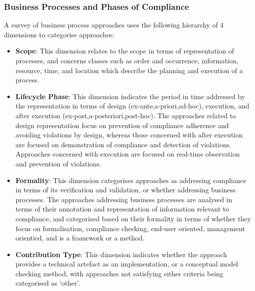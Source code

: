 \subsubsection{Business Processes and Phases of Compliance}
A survey of business process approaches \cite{fellmann_state---art_2014} uses the following hierarchy of 4 dimensions to categorise approaches:
\begin{itemize}
    \item \textbf{Scope}: This dimension relates to the scope in terms of representation of processes, and concerns classes such as order and occurrence, information, resource, time, and location which describe the planning and execution of a process.
    \item \textbf{Lifecycle Phase}: This dimension indicates the period in time addressed by the representation in terms of design (ex-ante,a-priori,ad-hoc), execution, and after execution (ex-post,a-posteriori,post-hoc). The approaches related to design representation focus on prevention of compliance adherence and avoiding violations by design, whereas those concerned with after execution are focused on demonstration of compliance and detection of violations. Approaches concerned with execution are focused on real-time observation and prevention of violations.
    \item \textbf{Formality}: This dimension categorises approaches as addressing compliance in terms of its verification and validation, or whether addressing business processes. The approaches addressing business processes are analysed in terms of their annotation and representation of information relevant to compliance, and categorised based on their formality in terms of whether they focus on formalisation, compliance checking, end-user oriented, management orientied, and is a framework or a method.
    \item \textbf{Contribution Type}: This dimension indicates whether the approach provides a technical artefact as an implementation, or a conceptual model checking method, with approaches not satisfying either criteria being categorised as `other'.
\end{itemize}

